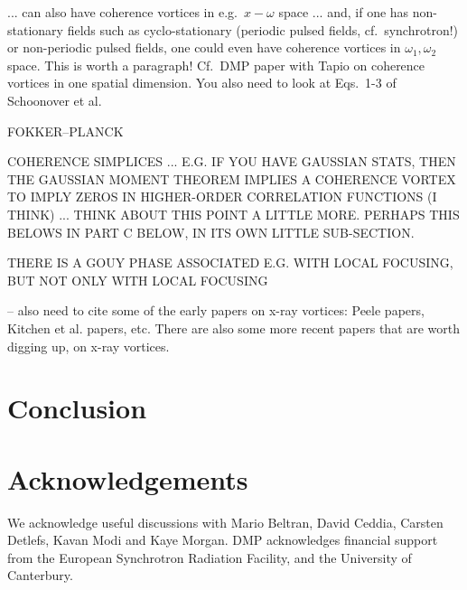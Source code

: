 \documentclass[%
 reprint,
 amsmath,amssymb,
 aps,
]{revtex4-1}
\begin{document}
... can also have coherence vortices in e.g.~$x-\omega$ space ... and, if one has non-stationary fields such as cyclo-stationary (periodic pulsed fields, cf.~synchrotron!) \cite{Gardner,BrynmorDavis} or non-periodic pulsed fields, one could even have coherence vortices in $\omega_1,\omega_2$ space.  This is worth a paragraph!  Cf.~DMP paper with Tapio on coherence vortices in one spatial dimension.  You also need to look at Eqs.~1-3 of Schoonover et al.\cite{Schoonover2009}

FOKKER--PLANCK

COHERENCE SIMPLICES ... E.G. IF YOU HAVE GAUSSIAN STATS, THEN THE GAUSSIAN MOMENT THEOREM IMPLIES A COHERENCE VORTEX TO IMPLY ZEROS IN HIGHER-ORDER CORRELATION FUNCTIONS (I THINK) ... THINK ABOUT THIS POINT A LITTLE MORE.  PERHAPS THIS BELOWS IN PART C BELOW, IN ITS OWN LITTLE SUB-SECTION.

THERE IS A GOUY PHASE ASSOCIATED E.G. WITH LOCAL FOCUSING, BUT NOT ONLY WITH LOCAL FOCUSING




-- also need to cite some of the early papers on x-ray vortices: Peele papers, Kitchen et al. papers, etc. There are also some more recent papers that are worth digging up, on x-ray vortices.

\section{\label{sec:conclusion}Conclusion}

\section*{Acknowledgements}

We acknowledge useful discussions with Mario Beltran, David Ceddia, Carsten Detlefs, Kavan Modi and Kaye Morgan. DMP acknowledges financial support from the European Synchrotron Radiation Facility, and the University of Canterbury.  


\end{document}
